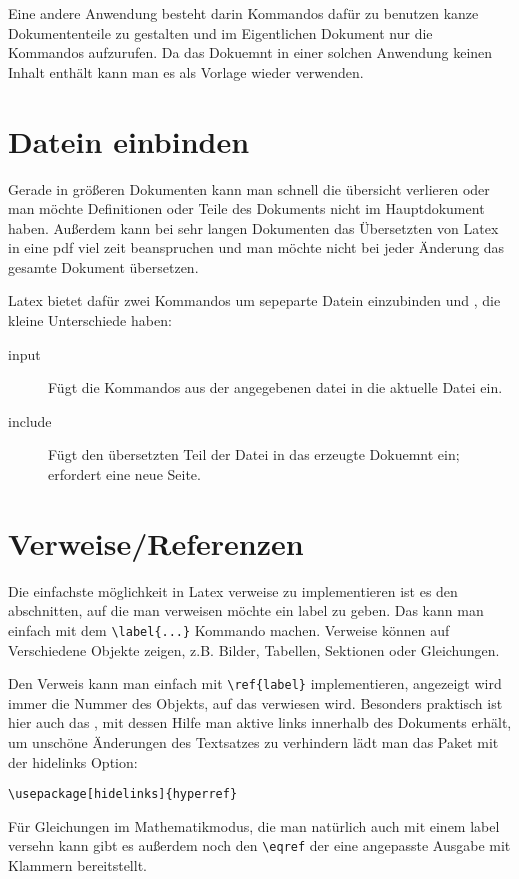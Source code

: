 Eine andere Anwendung besteht darin Kommandos dafür zu benutzen kanze Dokumententeile zu gestalten und im
Eigentlichen Dokument nur die Kommandos aufzurufen. Da das Dokuemnt in einer solchen Anwendung keinen Inhalt
enthält kann man es als Vorlage wieder verwenden. 

\section{Datein einbinden}
Gerade in größeren Dokumenten kann man schnell die übersicht verlieren oder man möchte Definitionen oder
Teile des Dokuments nicht im Hauptdokument haben. Außerdem kann bei sehr langen Dokumenten das Übersetzten
von Latex in eine pdf viel zeit beanspruchen und man möchte nicht bei jeder Änderung das gesamte Dokument
übersetzen. 

Latex bietet dafür zwei Kommandos um sepeparte Datein einzubinden \verb++ und \verb++,
die kleine Unterschiede haben:
\begin{description}
  \item[input] Fügt die Kommandos aus der angegebenen datei in die aktuelle Datei ein.
  \item[include] Fügt den übersetzten Teil der Datei in das erzeugte Dokuemnt ein; erfordert eine neue
    Seite. 
\end{description}

\section{Verweise/Referenzen}
Die einfachste möglichkeit in Latex verweise zu implementieren ist es den abschnitten, auf die man verweisen
möchte ein label zu geben. Das kann man einfach mit dem \verb+\label{...}+ Kommando machen. Verweise können auf
Verschiedene Objekte zeigen, z.B. Bilder, Tabellen, Sektionen oder Gleichungen.

Den Verweis kann man einfach mit \verb+\ref{label}+ implementieren, angezeigt wird immer die Nummer des Objekts,
auf das verwiesen wird. Besonders praktisch ist hier auch das , mit dessen Hilfe man aktive
links innerhalb des Dokuments erhält, um unschöne Änderungen des Textsatzes zu verhindern lädt man das Paket mit
der hidelinks Option:
\begin{verbatim}
\usepackage[hidelinks]{hyperref}
\end{verbatim}

Für Gleichungen im Mathematikmodus, die man natürlich auch mit einem label versehn kann gibt es außerdem noch
den \verb+\eqref+ der eine angepasste Ausgabe mit Klammern bereitstellt. 

